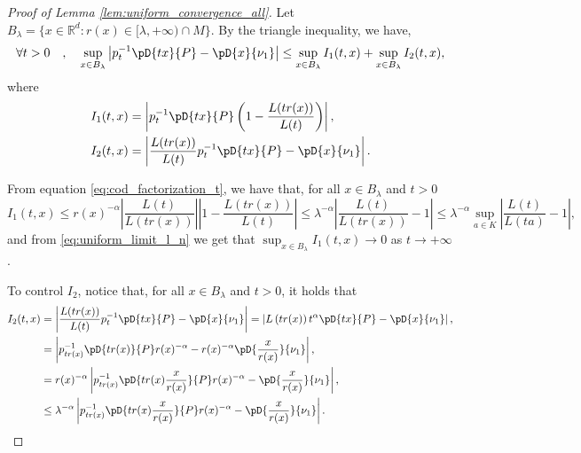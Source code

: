 \documentclass{article}
\numberwithin{equation}{section}
\newcommand{\R}{\mathbb{R}}
\newcommand{\coD}[2]{\pD{#1}{#2}}
\begin{document}
\begin{proof}[Proof of Lemma \ref{lem:uniform_convergence_all}]
    Let \(B_\lambda=\{x\in\R^d: r(x)\in [\lambda,+\infty)\cap M\}\).
    By the triangle inequality, we have,
    \begin{equation*}
        \forall t>0\quad,\quad\sup_{x\in
        B_\lambda}{\left|p_t^{-1}\coD{tx}{P}-\coD{x}{\nu_1}\right|}\leq
        \sup_{x\in B_{\lambda}}{I_1(t,x)}+\sup_{x\in B_{\lambda}}{I_2(t,x)},
    \end{equation*}
    where
    \begin{align*}
        I_1(t,x) & = \left|
        p_t^{-1}\coD{tx}{P}\left(1-\frac{L(tr(x))}{L(t)}\right) \right|, \\
        I_2(t,x) &
        =\left|\frac{L(tr(x))}{L(t)}p_t^{-1}\coD{tx}{P}-\coD{x}{\nu_1}\right|.
    \end{align*}

    From equation \eqref{eq:cod_factorization_t}, we have that, for
    all \(x\in B_{\lambda}\) and \(t>0\)
    \begin{equation*}
        {I_1(t,x)}\leq r(x)^{-\alpha}
        \left|\frac{L(t)}{L(tr(x))}\right|
        \left|1-\frac{L(tr(x))}{L(t)}\right|\leq
        \lambda^{-\alpha}\left|\frac{L(t)}{L(tr(x))}-1\right|\leq
        \lambda^{-\alpha}\sup_{a\in K} \left|\frac{L(t)}{L(ta)}-1\right|,
    \end{equation*}
    and from \eqref{eq:uniform_limit_l_n} we get that \(\sup_{x\in
    B_{\lambda}}{I_1(t,x)}\to 0\) as \(t\to +\infty\).

    To control \(I_2\), notice that, for all \(x\in B_{\lambda}\) and
    \(t>0\), it holds that
    \begin{align}
        I_2(t,x) & =
        \left|\frac{L(tr(x))}{L(t)}p_t^{-1}\coD{tx}{P}-\coD{x}{\nu_1}\right|
        =
        \left|L\left(tr(x)\right)t^{\alpha}\coD{tx}{P}-\coD{x}{\nu_1}\right|,
        \nonumber
        \\
        & = \left| p_{tr(x)}^{-1}\coD{tr(x)}{P}r(x)^{-\alpha}  -
        r(x)^{-\alpha}\coD{\frac{x}{r(x)}}{\nu_1}\right|,
        \nonumber
        \\
        & = r(x)^{-\alpha}\left|
        p_{tr(x)}^{-1}\coD{tr(x)\frac{x}{r(x)}}{P}r(x)^{-\alpha}  -
        \coD{\frac{x}{r(x)}}{\nu_1} \right|,
        \nonumber    \\
        & \leq \lambda^{-\alpha}\left|
        p_{tr(x)}^{-1}\coD{tr(x)\frac{x}{r(x)}}{P}r(x)^{-\alpha}  -
        \coD{\frac{x}{r(x)}}{\nu_1} \right|.\label{eq:control_I_2}
    \end{align}


\end{proof}
\end{document}
